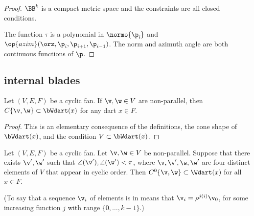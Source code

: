 \begin{proof} $\BB^k$ is a compact metric space and the constraints
are all closed conditions.

The function $\tau$ is a polynomial in $\normo{\p_i}$ and
$\op{azim}(\orz,\p_i,\p_{i+1},\p_{i-1})$.  The norm and azimuth
angle are both continuous functions of $\p$.
\end{proof}




\subsection{internal blades}


\begin{lemma} Let $(V,E,F)$ be a cyclic fan.
If $\v,\w\in V$ are non-parallel, then $C\{\v,\w\} \subset
\bWdart(x)$ for any dart $x\in F$.
\end{lemma}
%

\begin{proof} This is an elementary consequence of the definitions,
the cone shape of $\bWdart(x)$, and the condition $V\subset
\bWdart(x)$.
\end{proof}


\begin{lemma} \label{lemma:internal}
Let $(V,E,F)$ be a cyclic fan.  Let $\v,\w\in V$ be non-parallel.
Suppose that there exists $\v',\w'$ such that
$\angle(\v'),\angle(\w')<\pi$, where $\v,\v',\w,\w'$ are four
distinct elements of $V$ that appear in cyclic order.  Then
$C^0\{\v,\w\}\subset \Wdart(x)$ for all $x\in F$.
\end{lemma}
%
%
%

(To say that a sequence $\v_i$ of elements is in  means that $\v_i = \rho^{j (i)}\v_0$, for some increasing
function $j$ with range $\{0,\ldots,k-1\}$.)

